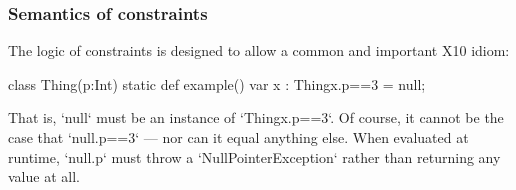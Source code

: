 \subsubsection{Semantics of constraints}
\label{SemanticsOfConstraints}


The logic of constraints is designed to allow a common and important X10
idiom: 
\begin{xten}
class Thing(p:Int){}
static def example(){
   var x : Thing{x.p==3} = null;
}
\end{xten}
That is, \xcd`null` must be an instance of \xcd`Thing{x.p==3}`.  
Of course, it cannot be the case that \xcd`null.p==3` --- nor can it equal
anything else.  When evaluated at runtime, \xcd`null.p` must throw a
\xcd`NullPointerException` rather than returning any value at all.

